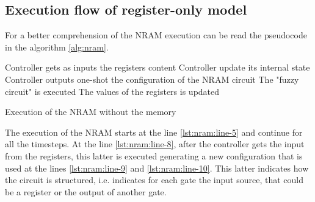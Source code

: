 \subsection{Execution flow of register-only model}
For a better comprehension of the NRAM execution can be read the pseudocode in the algorithm \ref{alg:nram}.
\begin{algorithm}
	\begin{algorithmic}[1]
		\label{lst:nram:line-5}
			\State Controller gets as inputs the registers content\label{lst:nram:line-6}
				\State Controller update its internal state
			\EndIf
			\State Controller outputs one-shot the configuration of the NRAM circuit\label{lst:nram:line-8}
			\State The "fuzzy circuit" is executed \label{lst:nram:line-9}
			\State The values of the registers is updated\label{lst:nram:line-10}
		\EndFor
	\end{algorithmic}
	\caption{Execution of the NRAM without the memory}\label{alg:nram}
\end{algorithm}

The execution of the NRAM starts at the line \ref{lst:nram:line-5} and continue for all the timesteps. At the line \ref{lst:nram:line-8}, after the controller gets the input from the registers, this latter is executed generating a new configuration that is used at the lines \ref{lst:nram:line-9} and \ref{lst:nram:line-10}. 
This latter indicates how the circuit is structured, i.e. indicates for each gate the input source, that could be a register or the output of another gate.

